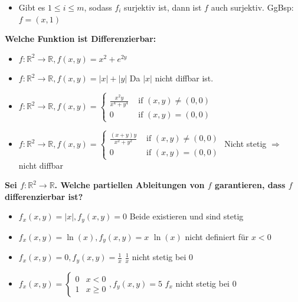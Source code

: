 \begin{flushleft}
\begin{itemize}[leftmargin = *]
\item[\textcolor{red}{F}] Gibt es $1 \leq i \leq m$, sodass $f_i$ surjektiv ist, dann ist $f$ auch surjektiv. \textcolor{Emerald}{GgBsp: $f=(x,1)$}
  
\end{itemize}







\textbf{Welche Funktion ist Differenzierbar:}

\begin{itemize}[leftmargin = *]
\item[\textcolor{green}{W}] $f: \mathbb{R}^2 \rightarrow \mathbb{R}, f(x, y)=x^2+e^{2 y}$
\item[\textcolor{red}{F}]  $f: \mathbb{R}^2 \rightarrow \mathbb{R}, f(x, y)=|x|+|y|$ \textcolor{Emerald}{Da $|x|$ nicht diffbar ist.}
\item[\textcolor{red}{F}] $f: \mathbb{R}^2 \rightarrow \mathbb{R}, f(x, y)= \begin{cases}\frac{x^2 y}{x^4+y^4} & \text { if }(x, y) \neq(0,0) \\ 0 & \text { if }(x, y)=(0,0)\end{cases}$ \textcolor{Emerald}{}
\item[\textcolor{red}{F}] $f: \mathbb{R}^2 \rightarrow \mathbb{R}, f(x, y)= \begin{cases}\frac{(x+y) y}{x^2+y^2} & \text { if }(x, y) \neq(0,0) \\ 0 & \text { if }(x, y)=(0,0)\end{cases}$  \textcolor{Emerald}{Nicht stetig $\Rightarrow$ nicht diffbar}
\end{itemize}


\textbf{Sei $f: \mathbb{R}^2 \rightarrow \mathbb{R}$. Welche partiellen Ableitungen von $f$ garantieren, dass $f$ differenzierbar ist? }

\begin{itemize}[leftmargin = *]
\item[\textcolor{green}{W}] $f_x(x, y)=|x|, f_y(x, y)=0$ \textcolor{Emerald}{Beide existieren und sind stetig}
\item[\textcolor{red}{F}]  $f_x(x, y)=\ln (x), f_y(x, y)=x$
\textcolor{Emerald}{$\ln(x)$ nicht definiert für $x<0$}
\item[\textcolor{red}{F}]   $f_x(x, y)=0, f_y(x, y)=\frac{1}{x}$ \textcolor{Emerald}{$\frac{1}{x}$ nicht stetig bei $0$}
\item[\textcolor{red}{F}]  $f_x(x, y)=\left\{\begin{array}{ll}0 & x<0 \\ 1 & x \geq 0\end{array}, f_y(x, y)=5\right.$ \textcolor{Emerald}{$f_x$ nicht stetig bei $0$}
\end{itemize}












\end{flushleft}
